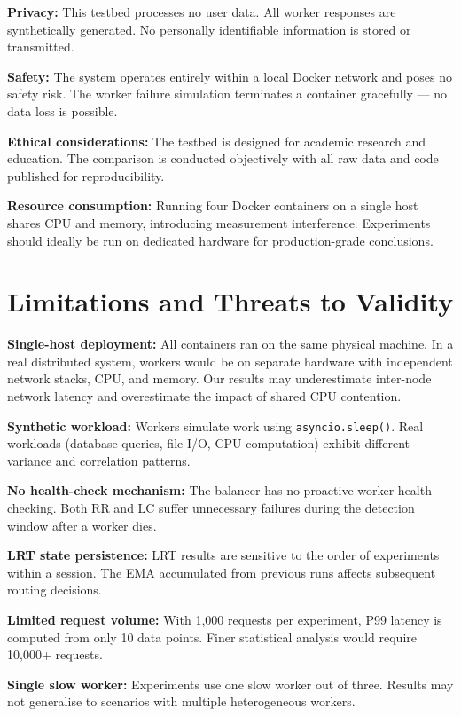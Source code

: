 \documentclass[conference]{IEEEtran}
\begin{document}
\textbf{Privacy:} This testbed processes no user data. All worker responses are synthetically generated. No personally identifiable information is stored or transmitted.

\textbf{Safety:} The system operates entirely within a local Docker network and poses no safety risk. The worker failure simulation terminates a container gracefully --- no data loss is possible.

\textbf{Ethical considerations:} The testbed is designed for academic research and education. The comparison is conducted objectively with all raw data and code published for reproducibility.

\textbf{Resource consumption:} Running four Docker containers on a single host shares CPU and memory, introducing measurement interference. Experiments should ideally be run on dedicated hardware for production-grade conclusions.

\section{Limitations and Threats to Validity}

\textbf{Single-host deployment:} All containers ran on the same physical machine. In a real distributed system, workers would be on separate hardware with independent network stacks, CPU, and memory. Our results may underestimate inter-node network latency and overestimate the impact of shared CPU contention.

\textbf{Synthetic workload:} Workers simulate work using \texttt{asyncio.sleep()}. Real workloads (database queries, file I/O, CPU computation) exhibit different variance and correlation patterns.

\textbf{No health-check mechanism:} The balancer has no proactive worker health checking. Both RR and LC suffer unnecessary failures during the detection window after a worker dies.

\textbf{LRT state persistence:} LRT results are sensitive to the order of experiments within a session. The EMA accumulated from previous runs affects subsequent routing decisions.

\textbf{Limited request volume:} With 1,000 requests per experiment, P99 latency is computed from only 10 data points. Finer statistical analysis would require 10,000+ requests.

\textbf{Single slow worker:} Experiments use one slow worker out of three. Results may not generalise to scenarios with multiple heterogeneous workers.
\end{document}
